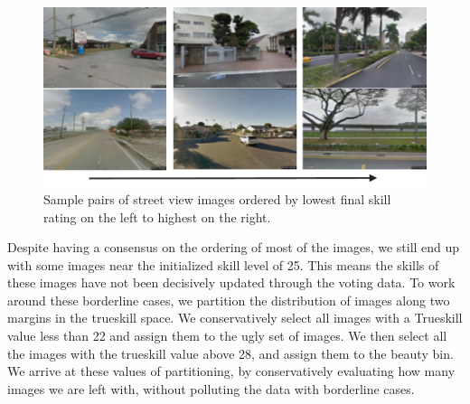 \begin{figure}[t!]
    \centering
    \includegraphics[width=\columnwidth]{SkillSorting.pdf}
    \caption{Sample pairs of street view images ordered by lowest final skill rating on the left to highest on the right. }
    \label{fig:trueskill_example}
\end{figure}
Despite having a consensus on the ordering of most of the images, we still end up with some images near the initialized skill level of 25. This means the skills of these images have not been decisively updated through the voting data. To work around these borderline cases, we partition the distribution of images along two margins in the trueskill space. We conservatively select all images with a Trueskill value less than 22 and assign them to the ugly set of images. We then select all the images with the trueskill value above 28, and assign them to the beauty bin. We arrive at these values of partitioning, by conservatively evaluating how many images we are left with, without polluting the data with borderline cases.


